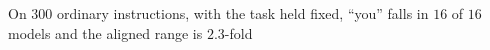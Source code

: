 On $300$ ordinary instructions, with the task held fixed, ``you'' falls in $16$ of $16$ models and the aligned range is $2.3$-fold